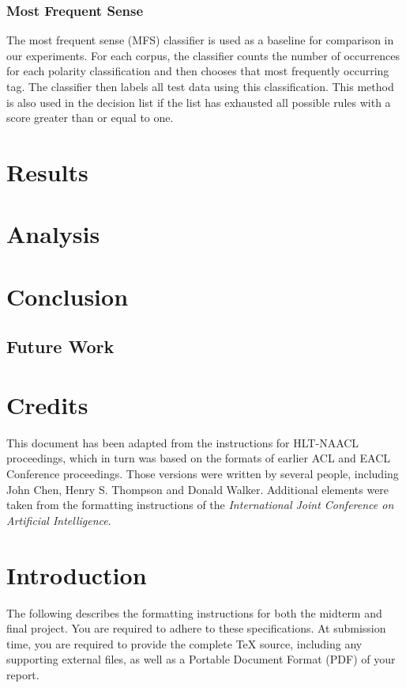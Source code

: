 \documentclass[11pt]{article}
\begin{document}
\subsubsection*{Most Frequent Sense}
The most frequent sense (MFS) classifier is used as a baseline for comparison in our experiments. For each corpus, the classifier counts the number of occurrences for each polarity classification and then chooses that most frequently occurring tag. The classifier then labels all test data using this classification. This method is also used in the decision list if the list has exhausted all possible rules with a score greater than or equal to one.

\section{Results}

\section{Analysis}

\section{Conclusion}
\subsection{Future Work}

\section{Credits}

This document has been adapted from the instructions for HLT-NAACL
proceedings, which in turn was based on the formats of earlier ACL and
EACL Conference proceedings.  Those versions were written by several
people, including John Chen, Henry S. Thompson and Donald Walker.
Additional elements were taken from the formatting instructions of the
{\em International Joint Conference on Artificial Intelligence}.

\section{Introduction}

The following describes the formatting instructions for both the
midterm and final project.  You are required to adhere to these
specifications.  At submission time, you are required to provide the
complete TeX source, including any supporting external files, as well
as a Portable Document Format (PDF) of your report.
\end{document}
